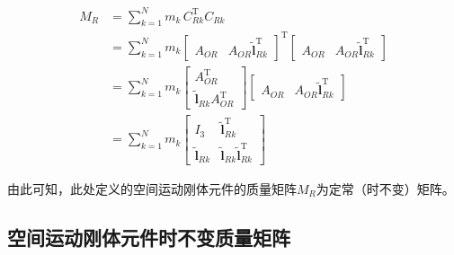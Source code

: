\begin{align}
M_R &= \sum_{k=1}^{N} m_k\,C_{Rk}^{\mathrm{T}}C_{Rk} \nonumber\\
&= \sum_{k=1}^{N} m_k
\begin{bmatrix}
A_{OR} & A_{OR}\tilde{\boldsymbol{l}}_{Rk}^{\mathrm{T}}
\end{bmatrix}^{\mathrm{T}}
\begin{bmatrix}
A_{OR} & A_{OR}\tilde{\boldsymbol{l}}_{Rk}^{\mathrm{T}}
\end{bmatrix} \nonumber\\
&= \sum_{k=1}^{N} m_k
\begin{bmatrix}
A_{OR}^{\mathrm{T}} \\[2pt] \tilde{\boldsymbol{l}}_{Rk}A_{OR}^{\mathrm{T}}
\end{bmatrix}
\begin{bmatrix}
A_{OR} & A_{OR}\tilde{\boldsymbol{l}}_{Rk}^{\mathrm{T}}
\end{bmatrix} \nonumber\\
&= \sum_{k=1}^{N} m_k
\begin{bmatrix}
I_3          & \tilde{\boldsymbol{l}}_{Rk}^{\mathrm{T}} \\[4pt]
\tilde{\boldsymbol{l}}_{Rk} & \tilde{\boldsymbol{l}}_{Rk}\tilde{\boldsymbol{l}}_{Rk}^{\mathrm{T}}
\end{bmatrix}
\label{eq:8.6}
\end{align}

由此可知，此处定义的空间运动刚体元件的质量矩阵$M_R$为定常（时不变）矩阵。

\subsection*{空间运动刚体元件时不变质量矩阵}

